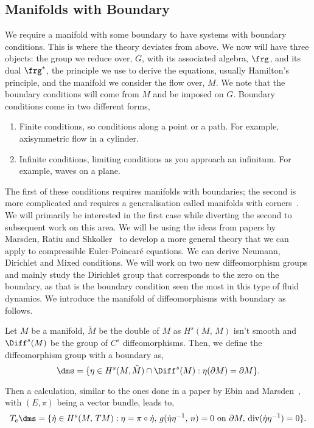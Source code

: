 \subsection{Manifolds with Boundary}
\label{ss:man_w_b}
We require a manifold with some boundary to have systems with boundary conditions. This is where the theory deviates from above. We now will have three objects: the group we reduce over, $G$, with its associated algebra, $\frg$, and its dual $\frg^*$, the principle we use to derive the equations, usually Hamilton's principle, and the manifold we consider the flow over, $M$. We note that the boundary conditions will come from $M$ and be imposed on $G$. Boundary conditions come in two different forms,
\begin{enumerate}
  \item Finite conditions, so conditions along a point or a path. For example, axisymmetric flow in a cylinder.
  \item Infinite conditions, limiting conditions as you approach an infinitum. For example, waves on a plane.
\end{enumerate}
\noindent
The first of these conditions requires manifolds with boundaries; the second is more complicated and requires a generalisation called manifolds with corners~\cite{joyce2010manifolds}. We will primarily be interested in the first case while diverting the second to subsequent work on this area. We will be using the ideas from papers by Marsden, Ratiu and Shkoller~\cite{marsden1999geometry,shkoller2000incompressible} to develop a more general theory that we can apply to compressible Euler-Poincar\'e equations. We can derive Neumann, Dirichlet and Mixed conditions. We will work on two new diffeomorphism groups and mainly study the Dirichlet group that corresponds to the zero on the boundary, as that is the boundary condition seen the most in this type of fluid dynamics. We introduce the manifold of diffeomorphisms with boundary as follows.
\begin{ndefi}
  Let $M$ be a manifold, $\tilde M$ be the double of $M$ as $H^s(M,\, M)$ isn't smooth and $\Diff^s(M)$ be the group of $C^s$ diffeomorphisms. Then, we define the diffeomorphism group with a boundary as,
  $$ \dms = \{\eta \in H^s(M, \tilde M) \cap \Diff^s(M) : \eta (\partial M) = \partial M \}. $$
\end{ndefi}

\noindent
Then a calculation, similar to the ones done in a paper by Ebin and Marsden~\cite{diffeost}, with $(E, \pi)$ being a vector bundle, leads to,
$$ T_e \dms = \{\dot \eta \in H^s(M,\, TM) : \eta = \pi \circ \dot \eta,\, g(\dot \eta\eta^{-1},\, n) = 0 \text{ on } \partial M,\, \mathrm{div}(\dot \eta \eta^{-1}) = 0 \}. $$

